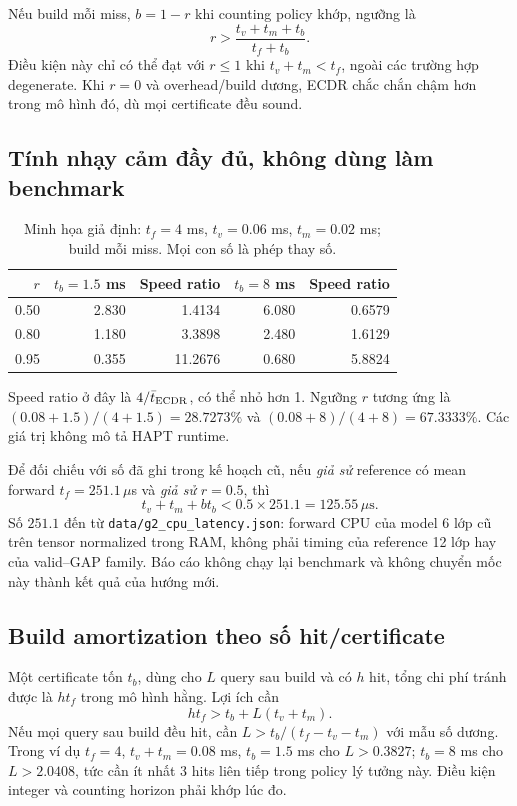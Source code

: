 \documentclass[11pt,a4paper]{article}
\newcommand{\code}[1]{{\small\ttfamily\nolinkurl{#1}}}
\theoremstyle{remark}
\begin{document}
Nếu build mỗi miss, $b=1-r$ khi counting policy khớp, ngưỡng là
\begin{equation}
 r>\frac{t_v+t_m+t_b}{t_f+t_b}.
\end{equation}
Điều kiện này chỉ có thể đạt với $r\le1$ khi $t_v+t_m<t_f$, ngoài các
trường hợp degenerate. Khi $r=0$ và overhead/build dương, ECDR chắc chắn
chậm hơn trong mô hình đó, dù mọi certificate đều sound.

\subsection{Tính nhạy cảm đầy đủ, không dùng làm benchmark}
\begin{table}[htbp]\centering
\caption{Minh họa giả định: $t_f=4$ ms, $t_v=0.06$ ms,
$t_m=0.02$ ms; build mỗi miss. Mọi con số là phép thay số.}
\begin{tabular}{@{}rrrrr@{}}\toprule
$r$ & $t_b=1.5$ ms & Speed ratio & $t_b=8$ ms & Speed ratio\\\midrule
0.50 &2.830&1.4134&6.080&0.6579\\
0.80 &1.180&3.3898&2.480&1.6129\\
0.95 &0.355&11.2676&0.680&5.8824\\\bottomrule
\end{tabular}
\end{table}
Speed ratio ở đây là $4/\bar t_{\rm ECDR}$, có thể nhỏ hơn 1.
Ngưỡng $r$ tương ứng là $(0.08+1.5)/(4+1.5)=28.7273\%$ và
$(0.08+8)/(4+8)=67.3333\%$. Các giá trị không mô tả HAPT runtime.

Để đối chiếu với số đã ghi trong kế hoạch cũ, nếu \emph{giả sử} reference
có mean forward $t_f=251.1\,\mu$s và \emph{giả sử} $r=0.5$, thì
\begin{equation}
 t_v+t_m+bt_b<0.5\times251.1=125.55\,\mu\mathrm{s}.
\end{equation}
Số $251.1$ đến từ \code{data/g2_cpu_latency.json}: forward CPU của model
6 lớp cũ trên tensor normalized trong RAM, không phải timing của reference
12 lớp hay của valid--GAP family. Báo cáo không chạy lại benchmark và
không chuyển mốc này thành kết quả của hướng mới.

\subsection{Build amortization theo số hit/certificate}
Một certificate tốn $t_b$, dùng cho $L$ query sau build và có $h$ hit, tổng
chi phí tránh được là $ht_f$ trong mô hình hằng. Lợi ích cần
\begin{equation}
 ht_f>t_b+L(t_v+t_m).
\end{equation}
Nếu mọi query sau build đều hit, cần
$L>t_b/(t_f-t_v-t_m)$ với mẫu số dương. Trong ví dụ $t_f=4$,
$t_v+t_m=0.08$ ms, $t_b=1.5$ ms cho $L>0.3827$; $t_b=8$ ms cho
$L>2.0408$, tức cần ít nhất 3 hits liên tiếp trong policy lý tưởng này.
Điều kiện integer và counting horizon phải khớp lúc đo.
\end{document}

